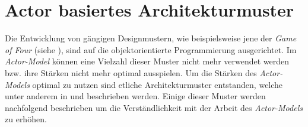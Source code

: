 \section{Actor basiertes Architekturmuster}
\label{sec:theory:actorArchitecture}
Die Entwicklung von gängigen Designmustern, wie beispielsweise jene der \textit{Game of Four} (siehe \cite{gangOfFour1995design}), sind auf die objektorientierte Programmierung ausgerichtet. Im \textit{ Actor-Model} können eine Vielzahl dieser Muster nicht mehr verwendet werden bzw. ihre Stärken nicht mehr optimal ausspielen. Um die Stärken des \textit{ Actor-Models} optimal zu nutzen sind etliche Architekturmuster entstanden, welche unter anderem in \cite{Vernon2015ReactiveAkka} und \cite{kuhn2017reactive} beschrieben werden. Einige dieser Muster werden nachfolgend beschrieben um die Verständlichkeit mit der Arbeit des \textit{ Actor-Models} zu erhöhen.

